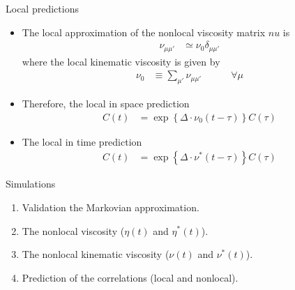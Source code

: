 \documentclass{beamer}
\newcommand{\esc}{\!\cdot\!}
\begin{document}
\begin{frame}{Local predictions}
  \begin{itemize}

\item The local approximation of the nonlocal viscosity matrix $nu$ is
\begin{align}
\nu_{\mu\mu'}&\simeq \nu_0 \delta_{\mu\mu'}
  \nonumber
\end{align}
where the local kinematic viscosity is given by 
\begin{align}
\nu_0&\equiv \sum_{\mu'}\nu_{\mu\mu'} \quad \quad \quad\forall \mu
\nonumber
\end{align}
\item Therefore, the \alert{local in space prediction}
\begin{align}
  C(t)&=\exp\left\{\Delta\esc \nu_0 (t-\tau) \right\}C(\tau)
\nonumber
\end{align}
    \item The \alert{local in time prediction}
\begin{align}
  C(t)&=\exp\left\{\Delta\esc \nu^* (t-\tau) \right\}C(\tau)
\nonumber
\end{align}
\end{itemize}
\end{frame}

 \begin{frame}{Simulations}
   \begin{enumerate}
     \item Validation the Markovian approximation.
     \item The nonlocal viscosity ($\eta(t)$ and $\eta^*(t)$). 
     \item The nonlocal kinematic viscosity ($\nu(t)$ and $\nu^*(t)$). 
     \item Prediction of the correlations (local and nonlocal). 
   \end{enumerate}
 \end{frame}
\end{document}

